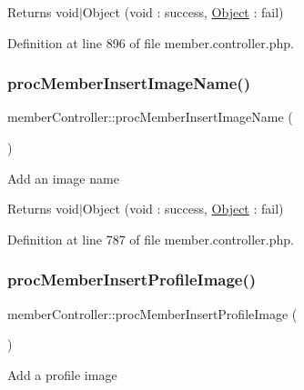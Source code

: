 \begin{DoxyReturn}{Returns}
void$\vert$\+Object (void \+: success, \hyperlink{classObject}{Object} \+: fail) 
\end{DoxyReturn}


Definition at line 896 of file member.\+controller.\+php.

\mbox{\label{classmemberController_a5477f3466e28c09d13f182406893a3d6}} 
\subsubsection{\texorpdfstring{proc\+Member\+Insert\+Image\+Name()}{procMemberInsertImageName()}}
{\footnotesize\ttfamily member\+Controller\+::proc\+Member\+Insert\+Image\+Name (\begin{DoxyParamCaption}{ }\end{DoxyParamCaption})}

Add an image name

\begin{DoxyReturn}{Returns}
void$\vert$\+Object (void \+: success, \hyperlink{classObject}{Object} \+: fail) 
\end{DoxyReturn}


Definition at line 787 of file member.\+controller.\+php.

\mbox{\label{classmemberController_ac8b43955581e87f21c77ee741f633a66}} 
\subsubsection{\texorpdfstring{proc\+Member\+Insert\+Profile\+Image()}{procMemberInsertProfileImage()}}
{\footnotesize\ttfamily member\+Controller\+::proc\+Member\+Insert\+Profile\+Image (\begin{DoxyParamCaption}{ }\end{DoxyParamCaption})}

Add a profile image

